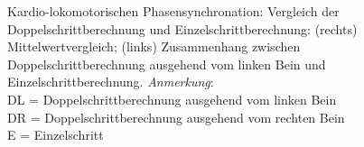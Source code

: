 \begin{figure}
	[!htb]  \caption[Kardio-lokomotorischen Phasensynchronation: Vergleich der Doppelschrittberechnung und Einzelschrittberechnung]{Kardio-lokomotorischen Phasensynchronation: Vergleich der Doppelschrittberechnung und Einzelschrittberechnung: (rechts) Mittelwertvergleich; (links) Zusammenhang zwischen Doppelschrittberechnung ausgehend vom linken Bein und Einzelschrittberechnung. \emph{Anmerkung}: \\ \hspace{\textwidth}DL = Doppelschrittberechnung ausgehend vom linken Bein \\ \hspace{\textwidth}DR = Doppelschrittberechnung ausgehend vom rechten Bein \\ \hspace{\textwidth}E = Einzelschritt} \label{fig:index_vergleich} 
\end{figure}

